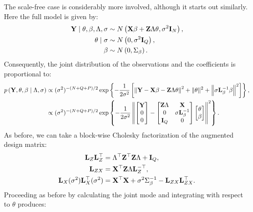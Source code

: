 \documentclass[10pt]{article}
\begin{document}
The scale-free case is considerably more involved, although it starts
out similarly. Here the full model is given by:
\begin{align*}
{\bf Y} \mid \theta, \beta, \Lambda, \sigma &
\sim
N\left({\bf X}\beta + {\bf Z}\Lambda\theta, \sigma^2{\bf I}_N\right),
\\
\theta \mid \sigma & \sim N\left(0,
  \sigma^2{\bf I}_Q\right), \\
\beta & \sim N\left(0,
  \Sigma_\beta\right).
\end{align*}
Consequently, the joint distribution of the observations and the coefficients is proportional to:
\begin{align*}
p\left({\bf Y}, \theta, \beta \mid \Lambda, \sigma\right) & \propto
(\sigma^2)^{-(N+Q+P)/2}\exp\left\{
-\frac{1}{2\sigma^2}\left[\left\|
{\bf Y} - {\bf X}\beta - {\bf Z}\Lambda\theta\right\|^2 + \|\theta\|^2
+ \left\|\sigma{\bf L}_\beta^{-1}\beta\right\|^2
\right]\right\}, \\
& \propto (\sigma^2)^{-(N+Q+P)/2}
\exp\left\{-\frac{1}{2\sigma^2}
\left\|
\begin{bmatrix}{\bf Y} \\ 0 \\ 0 \end{bmatrix} -
\begin{bmatrix}{\bf Z}\Lambda & {\bf X} \\
0 & \sigma{\bf L}_\beta^{-1} \\
{\bf I}_Q & 0
\end{bmatrix}
\begin{bmatrix} \theta \\ \beta \end{bmatrix}
\right\|^2\right\}.
\end{align*}
As before, we can take a block-wise Cholesky factorization of the
augmented design matrix:
\begin{align*}
{\bf L}_Z{\bf L}_Z^\top & = \Lambda^\top{\bf Z}^\top{\bf Z}\Lambda +
{\bf I}_Q, \\
{\bf L}_{ZX} & = {\bf X}^\top{\bf Z}\Lambda{\bf L}_Z^{-\top}, \\
{\bf L}_X(\sigma^2){\bf L}_X^\top(\sigma^2) & = {\bf X}^\top {\bf X} +
\sigma^2\Sigma_\beta^{-1}
- {\bf L}_{ZX}{\bf L}_{ZX}^\top.
\end{align*}
Proceeding as before by calculating the joint mode and integrating
with respect to $\theta$ produces:
\end{document}
